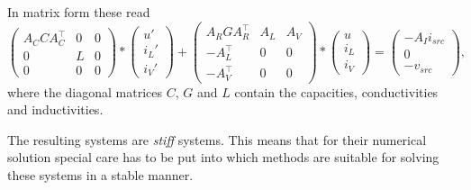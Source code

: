 In matrix form these read
\begin{equation}
	\label{MNA_Matrixform}
	\begin{pmatrix}
		A_C C A_C^\top & 0 & 0 \\
		0 & L & 0 \\
		0 & 0 & 0
	\end{pmatrix}
	*
	\begin{pmatrix}
		u' \\
		i_L' \\
		i_V'
	\end{pmatrix}
	+
	\begin{pmatrix}
		A_R G A_R^\top & A_L & A_V \\
		-A_L^\top & 0 & 0 \\
		-A_V^\top & 0 & 0 
	\end{pmatrix}
	*
	\begin{pmatrix}
		u \\
		i_L \\
		i_V
	\end{pmatrix}
	=
	\begin{pmatrix}
		-A_I i_{src} \\
		0 \\
		-v_{src}
	\end{pmatrix} , 
\end{equation}
where the diagonal matrices $C$, $G$ and $L$ contain the capacities, conductivities and inductivities.

The resulting systems are \emph{stiff} systems. This means that for their numerical solution special care has to be put into which methods are suitable for solving these systems in a stable manner.


